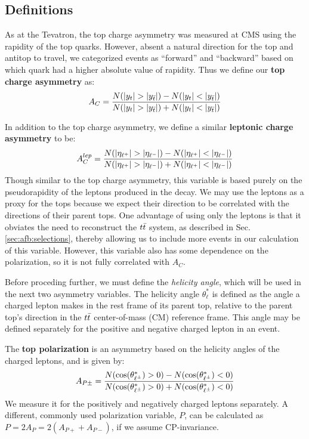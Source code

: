 \subsection{Definitions}
\label{ssec:afb:variables}

As at the Tevatron, the top charge asymmetry was measured at CMS using
the rapidity of the top quarks. However, absent a natural direction
for the top and antitop to travel, we categorized events as
``forward'' and ``backward'' based on which quark had a higher
absolute value of rapidity. Thus we define our \textbf{top charge
asymmetry} as:
\begin{equation}
A_C = \asymmetry{|y_t|}{|y_{\bar{t}}|}
\label{eq:afb:topchargeasym}
\end{equation}

In addition to the top charge asymmetry, we define a similar
\textbf{leptonic charge asymmetry} to be:
\begin{equation}
A_C^{lep} = \asymmetry{|\eta_{\ell^+}|}{|\eta_{\ell^-}|}
\end{equation}
Though similar to the top charge asymmetry, this variable
is based purely on the pseudorapidity of the leptons produced in the
decay. We may use the leptons as a proxy for the tops because we
expect their direction to be correlated with the directions of their
parent tops. One advantage of using only the leptons is that it obviates the
need to reconstruct the $t\bar{t}$ system, as described in Sec.
\ref{sec:afb:selections}, thereby allowing us to include more events in
our calculation of this variable. However, this variable also has some
dependence on the polarization, so it is not fully correlated with $A_C$.

Before proceding further, we must define the \emph{helicity angle}, which
will be used in the next two asymmetry variables.
The helicity angle $\theta^*_{\ell}$ is defined as the angle
a charged lepton makes in the rest frame of its parent top,
relative to the parent top's direction in the $t\bar{t}$ center-of-mass
(CM) reference frame. This angle may be defined separately for the
positive and negative charged lepton in an event.

The \textbf{top polarization} is an asymmetry based on the helicity %
angles of the charged leptons, and is given by:
\begin{equation}
A_{P\pm} = \frac{N(\cos(\theta^*_{\ell^\pm})>0) - N(\cos(\theta^*_{\ell^\pm})<0)}{N(\cos(\theta^*_{\ell^\pm})>0) + N(\cos(\theta^*_{\ell^\pm})<0)}
\end{equation}
We measure it for the positively and
negatively charged leptons separately. A different, commonly used
polarization variable, $P$, can be calculated as $P = 2 A_P = 2(
A_{P+} + A_{P-})$, if we assume CP-invariance.


